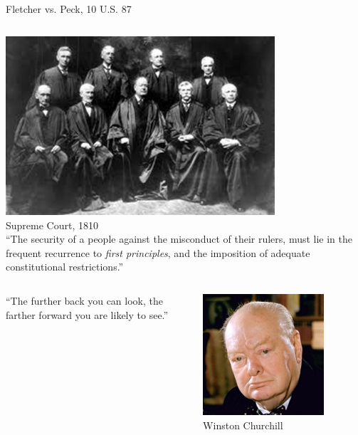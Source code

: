\begin{frame}{Fletcher vs. Peck, 10 U.S. 87}
    \begin{columns}[onlytextwidth]
            \centering
            \includegraphics[width=0.75\textwidth]{img/supreme-court-1810.png} \\
            Supreme Court, 1810 \\

            ``The security of a people against the misconduct of their rulers,
            must lie in the frequent recurrence to \emph{first principles}, and
            the imposition of adequate constitutional restrictions.''
    \end{columns}
\end{frame}

\begin{frame}
    \begin{columns}[onlytextwidth]
            ``The further back you can look, the farther forward you are likely to see.''

            \centering
            \includegraphics[width=0.75\textwidth]{img/winston-churchill.png} \\
            Winston Churchill \\
    \end{columns}
\end{frame}

